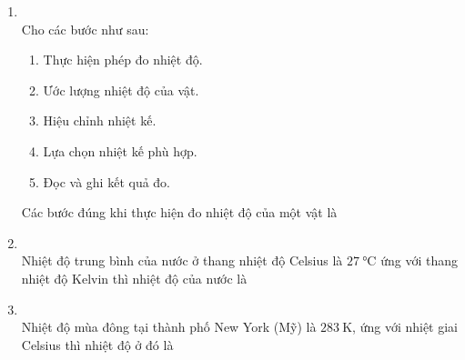 \begin{enumerate}[label=\bfseries Câu \arabic*:, leftmargin=1.7cm]
\item {}\\
Cho các bước như sau:
\begin{enumerate}[label=(\arabic*)]
	\item Thực hiện phép đo nhiệt độ.
	\item Ước lượng nhiệt độ của vật.
	\item Hiệu chỉnh nhiệt kế.
	\item Lựa chọn nhiệt kế phù hợp.
	\item Đọc và ghi kết quả đo.
\end{enumerate}
Các bước đúng khi thực hiện đo nhiệt độ của một vật là

\item {}\\
Nhiệt độ trung bình của nước ở thang nhiệt độ Celsius là $\SI{27}{\celsius}$ ứng với thang nhiệt độ Kelvin thì nhiệt độ của nước là

\item {}\\
Nhiệt độ mùa đông tại thành phố New York (Mỹ) là $\SI{283}{\kelvin}$, ứng với nhiệt giai Celsius thì nhiệt độ ở đó là


\end{enumerate}
